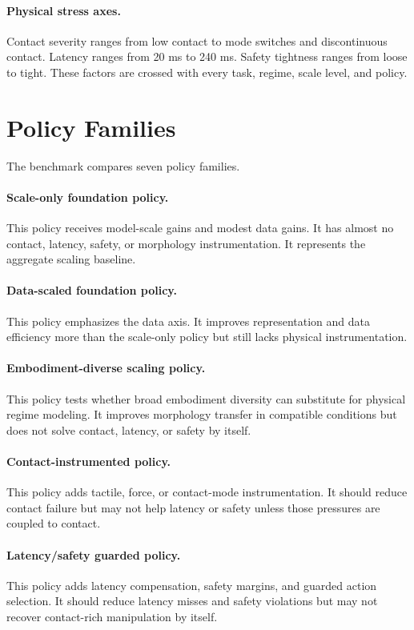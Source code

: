 \documentclass{article}
\begin{document}
\paragraph{Physical stress axes.}
Contact severity ranges from low contact to mode switches and discontinuous contact. Latency ranges from 20 ms to 240 ms. Safety tightness ranges from loose to tight. These factors are crossed with every task, regime, scale level, and policy.

\section{Policy Families}

The benchmark compares seven policy families.

\paragraph{Scale-only foundation policy.}
This policy receives model-scale gains and modest data gains. It has almost no contact, latency, safety, or morphology instrumentation. It represents the aggregate scaling baseline.

\paragraph{Data-scaled foundation policy.}
This policy emphasizes the data axis. It improves representation and data efficiency more than the scale-only policy but still lacks physical instrumentation.

\paragraph{Embodiment-diverse scaling policy.}
This policy tests whether broad embodiment diversity can substitute for physical regime modeling. It improves morphology transfer in compatible conditions but does not solve contact, latency, or safety by itself.

\paragraph{Contact-instrumented policy.}
This policy adds tactile, force, or contact-mode instrumentation. It should reduce contact failure but may not help latency or safety unless those pressures are coupled to contact.

\paragraph{Latency/safety guarded policy.}
This policy adds latency compensation, safety margins, and guarded action selection. It should reduce latency misses and safety violations but may not recover contact-rich manipulation by itself.
\end{document}
